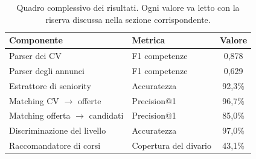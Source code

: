 \begin{table}[htbp]
  \centering
  \caption{Quadro complessivo dei risultati. Ogni valore va letto con la
           riserva discussa nella sezione corrispondente.}
  \label{tab:riepilogo}
  \begin{tabular}{llc}
    \toprule
    \textbf{Componente} & \textbf{Metrica} & \textbf{Valore} \\
    \midrule
    Parser dei CV            & F1 competenze          & 0,878 \\
    Parser degli annunci     & F1 competenze          & 0,629 \\
    Estrattore di seniority  & Accuratezza            & 92,3\% \\
    Matching CV $\to$ offerte & Precision@1           & 96,7\% \\
    Matching offerta $\to$ candidati & Precision@1    & 85,0\% \\
    Discriminazione del livello & Accuratezza         & 97,0\% \\
    Raccomandatore di corsi  & Copertura del divario  & 43,1\% \\
    \bottomrule
  \end{tabular}
\end{table}
